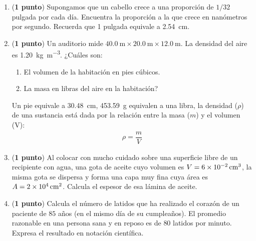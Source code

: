 \documentclass[14pt]{extarticle}
\begin{document}
\begin{enumerate}
\begin{enumerate}
\item \SI{0.032}{\kilo\gram}
\item \SI{15}{\gram}
\item \SI{2.7d5}{\milli\gram}
\item \SI{4.1d-8}{\giga\gram}
\item \SI{2.7d8}{\micro\gram}
\end{enumerate}
Si dos masas son iguales, dales igual lugar en la lista.
\item (\textbf{1 punto}) Supongamos que un cabello crece a una proporción de $1/32$ pulgada por cada día. Encuentra la proporción a la que crece en nanómetros por segundo. Recuerda que 1 pulgada equivale a \SI{2.54}{\centi\meter}.
\item (\textbf{1 punto}) Un auditorio mide $\SI{40.0}{\meter} \times \SI{20.0}{\meter} \times \SI{12.0}{\meter}$. La densidad del aire es \SI{1.20}{\kilo\gram\per\cubic\meter}. ¿Cuáles son:
\begin{enumerate}
\item El volumen de la habitación en pies cúbicos.
\item La masa en libras del aire en la habitación?
\end{enumerate}
Un pie equivale a \SI{30.48}{\centi\meter}, \SI{453.59}{\gram} equivalen a una libra, la densidad ($\rho$) de una sustancia está dada por la relación entre la masa ($m$) y el volumen (V):
\begin{align*}
\rho = \dfrac{m}{V}
\end{align*}
\item (\textbf{1 punto}) Al colocar con mucho cuidado sobre una superficie libre de un recipiente con agua, una gota de aceite cuyo volumen es $V = \SI{6d-2}{\cubic\centi\meter}$, la misma gota se dispersa y forma una capa muy fina cuya área es $A = \SI{2d4}{\square\centi\meter}$. Calcula el espesor de esa lámina de aceite.
\item (\textbf{1 punto}) Calcula el número de latidos que ha realizado el corazón de un paciente de $85$ años (en el mismo día de su cumpleaños). El promedio razonable en una persona sana y en reposo es de $80$ latidos por minuto. Expresa el resultado en notación científica.
\end{enumerate}
\end{document}
